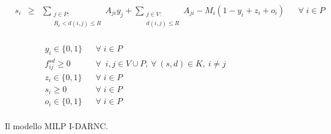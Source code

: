 \begin{figure}
		
		
		\begin{equation} \label{eq:setSlb}
		\begin{array}{rrclcl}
		& s_{i} & \geq & \displaystyle \sum_{\substack{j \in P :\\ R_{\epsilon} < d(i,j) \le R} } A_{ji} y_{j} + \displaystyle \sum_{\substack{j \in V :\\ d(i,j) \le R %
			}}
			A_{ji} - M_i (1 - y_i + z_i + o_i) %
			&& \forall \; i \in P\\
			\end{array}
			\end{equation}
			
			
			
			
			
			
			\begin{equation} \label{eq:vars}
			\begin{array}{rlclcl}	
			& y_i \in \{0, 1\} && \forall \; i \in P \\
			& f^{sd}_{ij} \ge 0 && \forall \  \; i , j \in V \cup P,\  \forall \  (s,d) \in K,\  i \neq j \\
			& z_i \in \{0, 1\} && \forall \; i \in P \\
			& s_i \ge 0 && \forall \; i \in P \\
			& o_i \in \{0, 1\} && \forall \; i \in P \\
			\end{array}
			\end{equation}
		
		\caption{Il modello MILP I-DARNC.}\label{fig:MILP}
	\end{figure}

